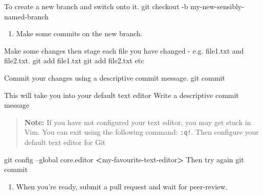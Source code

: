\documentclass[]{book}
\newenvironment{Shaded}{\begin{snugshade}}{\end{snugshade}}
\newcommand{\ExtensionTok}[1]{#1}
\newcommand{\FunctionTok}[1]{\textcolor[rgb]{0.00,0.00,0.00}{#1}}
\newcommand{\NormalTok}[1]{#1}
\newcommand{\OperatorTok}[1]{\textcolor[rgb]{0.81,0.36,0.00}{\textbf{#1}}}
\providecommand{\tightlist}{%
  \setlength{\itemsep}{0pt}\setlength{\parskip}{0pt}}
\begin{document}
\begin{Shaded}
\begin{Highlighting}[]
\ExtensionTok{To}\NormalTok{ create a new branch and switch onto it.}
\FunctionTok{git}\NormalTok{ checkout -b my-new-sensibly-named-branch}
\end{Highlighting}
\end{Shaded}

\begin{enumerate}
\def\labelenumi{\arabic{enumi}.}
\setcounter{enumi}{3}
\tightlist
\item
  Make some commits on the new branch.
\end{enumerate}

\begin{Shaded}
\begin{Highlighting}[]
\ExtensionTok{Make}\NormalTok{ some changes then stage each file you have changed - e.g. file1.txt and file2.txt.}
\FunctionTok{git}\NormalTok{ add file1.txt}
\FunctionTok{git}\NormalTok{ add file2.txt}
\ExtensionTok{etc}

\ExtensionTok{Commit}\NormalTok{ your changes using a descriptive commit message.}
\FunctionTok{git}\NormalTok{ commit}

\ExtensionTok{This}\NormalTok{ will take you into your default text editor}
\ExtensionTok{Write}\NormalTok{ a descriptive commit message}
\end{Highlighting}
\end{Shaded}

\begin{quote}
\textbf{Note:}
If you have not configured your text editor, you may get stuck in Vim. You can exit using the following command: \texttt{:q!}. Then configure your default text editor for Git
\end{quote}

\begin{Shaded}
\begin{Highlighting}[]
\FunctionTok{git}\NormalTok{ config --global core.editor }\OperatorTok{<}\NormalTok{my-favourite-text-editor}\OperatorTok{>}
 \ExtensionTok{Then}\NormalTok{ try again}
\FunctionTok{git}\NormalTok{ commit}
\end{Highlighting}
\end{Shaded}

\begin{enumerate}
\def\labelenumi{\arabic{enumi}.}
\setcounter{enumi}{4}
\tightlist
\item
  When you're ready, submit a pull request and wait for peer-review.
\end{enumerate}
\end{document}
